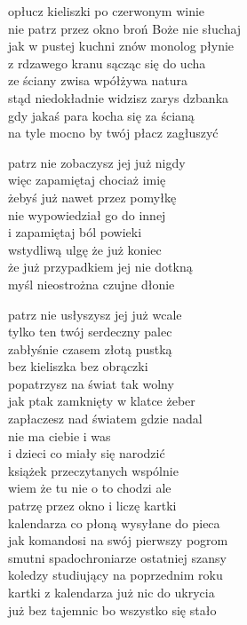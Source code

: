 \begin{text}
    opłucz kieliszki po czerwonym winie\\
    nie patrz przez okno broń Boże nie słuchaj\\
    jak w pustej kuchni znów monolog płynie\\
    z rdzawego kranu sącząc się do ucha\\
    ze ściany zwisa wpółżywa natura\\
    stąd niedokładnie widzisz zarys dzbanka\\
    gdy jakaś para kocha się za ścianą\\
    na tyle mocno by twój płacz zagłuszyć

    patrz nie zobaczysz jej już nigdy\\
    więc zapamiętaj chociaż imię\\
    żebyś już nawet przez pomyłkę\\
    nie wypowiedział go do innej\\
    i zapamiętaj ból powieki\\
    wstydliwą ulgę że już koniec\\
    że już przypadkiem jej nie dotkną\\
    myśl nieostrożna czujne dłonie

    patrz nie usłyszysz jej już wcale\\
    tylko ten twój serdeczny palec\\
    zabłyśnie czasem złotą pustką\\
    bez kieliszka bez obrączki\\
    popatrzysz na świat tak wolny\\
    jak ptak zamknięty w klatce żeber\\
    zapłaczesz nad światem gdzie nadal\\
    nie ma ciebie i was\\
    i dzieci co miały się narodzić\\
    książek przeczytanych wspólnie\\
    wiem że tu nie o to chodzi ale\\
    patrzę przez okno i liczę kartki\\
    kalendarza co płoną wysyłane do pieca\\
    jak komandosi na swój pierwszy pogrom\\
    smutni spadochroniarze ostatniej szansy\\
    koledzy studiujący na poprzednim roku\\
    kartki z kalendarza już nic do ukrycia\\
    już bez tajemnic bo wszystko się stało


\end{text}
